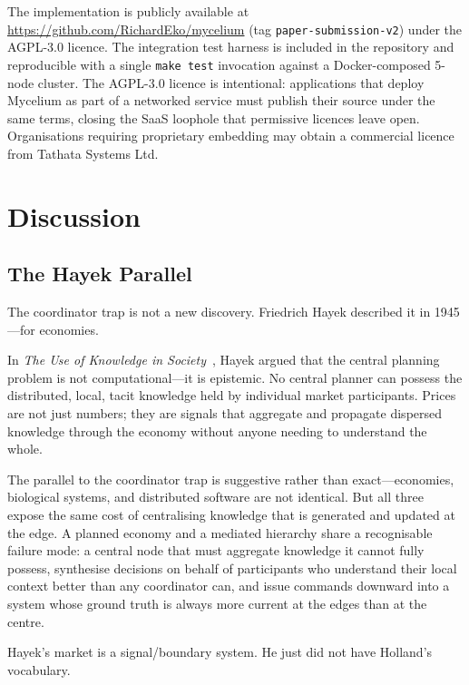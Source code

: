 \documentclass[11pt]{article}
\begin{document}
The implementation is publicly available at
\url{https://github.com/RichardEko/mycelium} (tag \texttt{paper-submission-v2}) under the AGPL-3.0 licence.
The integration test harness is included in the repository and reproducible with a
single \texttt{make test} invocation against a Docker-composed 5-node cluster.
The AGPL-3.0 licence is intentional: applications that deploy Mycelium as part of a
networked service must publish their source under the same terms, closing the
SaaS loophole that permissive licences leave open. Organisations requiring
proprietary embedding may obtain a commercial licence from Tathata Systems Ltd.

\section{Discussion}

\subsection{The Hayek Parallel}

The coordinator trap is not a new discovery. Friedrich Hayek described it in
1945---for economies.

In \emph{The Use of Knowledge in Society}~\cite{hayek}, Hayek argued that the
central planning problem is not computational---it is epistemic. No central
planner can possess the distributed, local, tacit knowledge held by individual
market participants. Prices are not just numbers; they are signals that aggregate
and propagate dispersed knowledge through the economy without anyone needing to
understand the whole.

The parallel to the coordinator trap is suggestive rather than exact---economies,
biological systems, and distributed software are not identical. But all three
expose the same cost of centralising knowledge that is generated and updated at
the edge. A planned economy and a mediated hierarchy share a recognisable failure
mode: a central node that must aggregate knowledge it cannot fully possess,
synthesise decisions on behalf of participants who understand their local context
better than any coordinator can, and issue commands downward into a system whose
ground truth is always more current at the edges than at the centre.

Hayek's market is a signal/boundary system. He just did not have Holland's
vocabulary.
\end{document}
